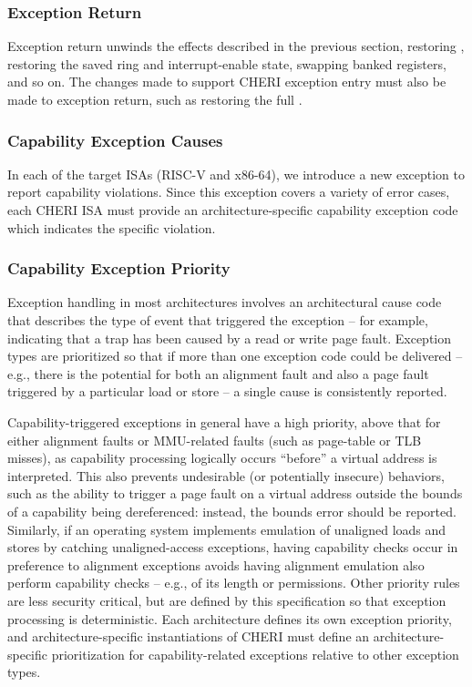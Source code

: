 \subsubsection{Exception Return}

Exception return unwinds the effects described in the previous section,
restoring \PC{}, restoring the saved ring and interrupt-enable
state, swapping banked registers, and so on.
The changes made to support CHERI exception entry must also be made to
exception return, such as restoring the full \PCC{}.

\subsubsection{Capability Exception Causes}
\label{sec:capability_exception_causes}

In each of the target ISAs (RISC-V and x86-64), we introduce a new
exception to report capability violations.
Since this exception covers a variety of error cases, each CHERI ISA
must provide an architecture-specific capability exception code
which indicates the specific violation.

\subsubsection{Capability Exception Priority}
\label{sec:capability_exception_priority}

Exception handling in most architectures involves an architectural cause code
that describes the type of event that triggered the exception -- for example,
indicating that a trap has been caused by a read or write page fault.
Exception types are prioritized so that if more than one exception code could
be delivered -- e.g., there is the potential for both an alignment fault and
also a page fault triggered by a particular load or store -- a single cause is
consistently reported.

Capability-triggered exceptions in general have a high priority, above that
for either alignment faults or MMU-related faults (such as page-table or TLB
misses), as capability processing logically occurs ``before'' a virtual
address is interpreted.
This also prevents undesirable (or potentially insecure) behaviors, such as
the ability to trigger a page fault on a virtual address outside the bounds of
a capability being dereferenced: instead, the bounds error should be reported.
Similarly, if an operating system implements emulation of unaligned loads and
stores by catching unaligned-access exceptions, having capability checks occur
in preference to alignment exceptions avoids having alignment emulation also
perform capability checks -- e.g., of its length or permissions.
Other priority rules are less security critical, but are defined by this
specification so that exception processing is deterministic.
Each architecture defines its own exception priority, and
architecture-specific instantiations of CHERI must define an
architecture-specific prioritization for capability-related exceptions
relative to other exception types.

